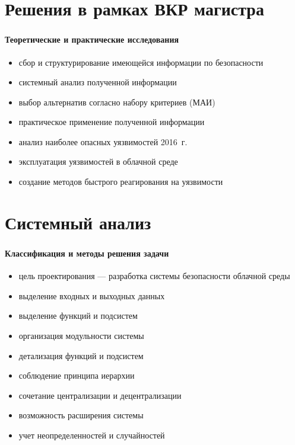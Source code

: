 
\section{Решения в рамках ВКР магистра}

\begin{frame}
\frametitle{\insertsection}
\framesubtitle{Теоретические и практические исследования}

\begin{itemize}
    \item сбор и структурирование имеющейся информации по безопасности
    \item системный анализ полученной информации
    \item выбор альтернатив согласно набору критериев (МАИ)
    \item практическое применение полученной информации
    \item анализ наиболее опасных уязвимостей 2016~г.
    \item эксплуатация уязвимостей в облачной среде
    \item создание методов быстрого реагирования на уязвимости
\end{itemize}
\end{frame}


\section{Системный анализ}

\begin{frame}
\frametitle{\insertsection}
\framesubtitle{Классификация и методы решения задачи}

\begin{itemize}
    \item цель проектирования --- разработка системы безопасности облачной среды
    \item выделение входных и выходных данных
    \item выделение функций и подсистем
    \item организация модульности системы
    \item детализация функций и подсистем
    \item соблюдение принципа иерархии
    \item сочетание централизации и децентрализации
    \item возможность расширения системы
    \item учет неопределенностей и случайностей
\end{itemize}
\end{frame}


